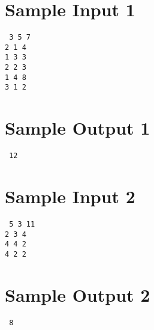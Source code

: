 \begin{multicols}{2}
    \section*{Sample Input 1}
        {\tt
        3 5 7\\
        2 1 4\\
        1 3 3\\
        2 2 3\\
        1 4 8\\
        3 1 2
        }
    \section*{Sample Output 1}
        {\tt
        12
        }
    \section*{Sample Input 2}
        {\tt
        5 3 11\\
        2 3 4\\
        4 4 2\\
        4 2 2
        }
    \section*{Sample Output 2}
        {\tt
        8
        }
\end{multicols}
